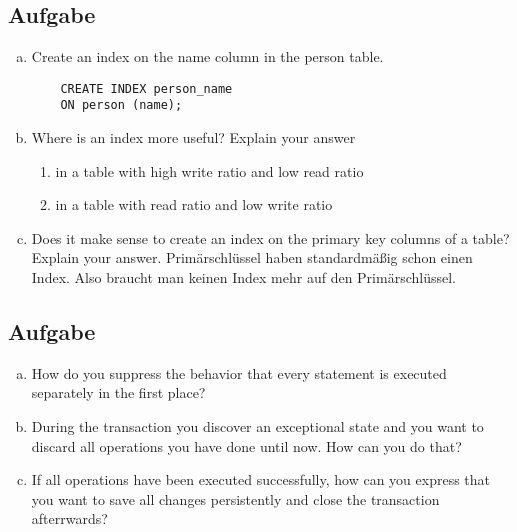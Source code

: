 \documentclass[11pt,a4paper,DIV=9]{scrartcl}
\newcounter{temp}
\newcommand{\aufgabe}[1]{
  \setcounter{temp}{\value{subsection}}
  \setcounter{subsection}{#1}
  \addtocounter{subsection}{-1}
  \subsection{Aufgabe}
  \setcounter{subsection}{\value{temp}}
}
\begin{document}
  \aufgabe{3}
    \begin{enumerate}[a.]
    \item Create an index on the name column in the person table.
    \begin{lstlisting}
    CREATE INDEX person_name
    ON person (name);
    \end{lstlisting}
    \item Where is an index more useful? Explain your answer
    \begin{enumerate}[1.]
    \item in a table with high write ratio and low read ratio
    \item in a table with read ratio and low write ratio
    \end{enumerate}
    \item Does it make sense to create an index on the primary key columns of a table? Explain your answer.
    Prim\"arschl\"ussel haben standardm\"a{\ss}ig schon einen Index. Also braucht man keinen Index mehr auf den Prim\"arschl\"ussel.
    \end{enumerate}
    \aufgabe{4}
      \begin{enumerate}[a.]
      \item How do you suppress the behavior that every statement is executed separately in the first place?
      \item During the transaction you discover an exceptional state and you want to discard all operations you have done until now. How can you do that?
      \item If all operations have been executed successfully, how can you express that you want to save all changes persistently and close the transaction afterrwards? 
      \end{enumerate}
\end{document}
